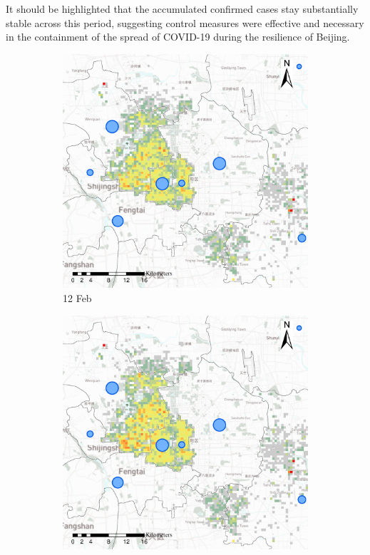 \documentclass[preprints,article,accept,moreauthors,pdftex]{Definitions/mdpi}
\begin{document}
It should be highlighted that the accumulated confirmed cases stay substantially stable across this period, suggesting control measures were effective and necessary in the containment of the spread of COVID-19 during the resilience of Beijing.

\begin{figure}[ht]
    \centering
    \begin{subfigure}{.3\textwidth}
        \includegraphics[width=\textwidth]{Figures/Relation_with_confrimed_cases/NewDistrictSSBD2020_02_12.eps}
        \caption{12 Feb}\label{fig:correlation_02_12}
    \end{subfigure}
    \begin{subfigure}{.3\textwidth}
        \includegraphics[width=\textwidth]{Figures/Relation_with_confrimed_cases/NewDistrictSSBD2020_02_17.eps}

\end{subfigure}
\end{figure}
\end{document}
